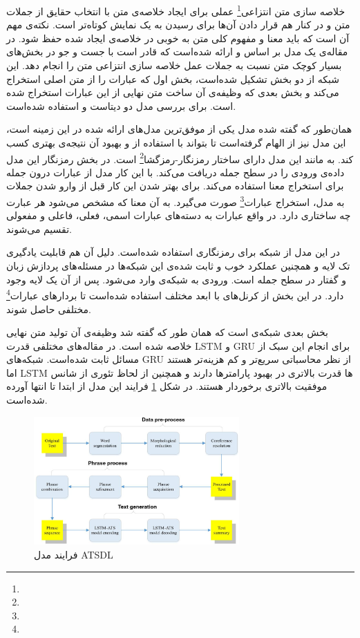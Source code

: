 \documentclass[12pt, a4paper, oneside]{report}
\begin{document}
خلاصه سازی متن انتزاعی\footnote{}
عملی برای ایجاد خلاصه‌ی متن با انتخاب حقایق از جملات متن و در کنار هم قرار دادن آن‌ها برای رسیدن به یک
نمایش کوتاه‌تر است. نکته‌ی مهم آن است که باید معنا و مفهوم کلی متن به خوبی در خلاصه‌ی ایجاد شده حفظ شود.
در مقاله‌ی
\cite{song2019abstractive}
یک مدل بر اساس
و
ارائه شده‌است که قادر است با جست و جو در بخش‌های بسیار کوچک متن نسبت به جملات عمل خلاصه سازی انتزاعی
متن را انجام دهد.
این شبکه از دو بخش تشکیل شده‌است، بخش اول که عبارات را از متن اصلی استخراج می‌کند
و بخش بعدی که وظیفه‌ی آن ساخت متن نهایی از این عبارات استخراج شده است.
برای بررسی مدل دو دیتاست
و
استفاده شده‌است. 

همان‌طور که گفته شده مدل
یکی از موفق‌ترین مدل‌های ارائه شده در این زمینه است، این مدل نیز از
الهام گرفته‌است تا بتواند با استفاده از و بهبود آن نتیجه‌ی بهتری کسب کند.
به مانند
این مدل دارای ساختار
رمزنگار-رمزگشا\footnote{}
است. در بخش رمزنگار این مدل داده‌ی ورودی را در سطح جمله دریافت می‌کند. با این کار مدل از
عبارات درون جمله برای استخراج معنا استفاده می‌کند. برای بهتر شدن این کار قبل از وارو شدن جملات به
مدل، استخراج عبارات\footnote{}
صورت می‌گیرد. به آن معنا که مشخص می‌شود هر عبارت چه ساختاری دارد. در واقع عبارات به
دسته‌های عبارات اسمی، فعلی، فاعلی و مفعولی تقسیم می‌شوند. 

در این مدل از شبکه
برای رمزنگاری استفاده شده‌است. دلیل آن هم قابلیت یادگیری تک لایه و همچنین عملکرد خوب و ثابت شده‌ی
این شبکه‌ها در مسئله‌های پردازش زبان و گفتار در سطح جمله است. ورودی به شبکه‌ی
وارد می‌شود. پس از آن یک لایه
وجود دارد. در این بخش از کرنل‌های با ابعد مختلف استفاده شده‌است تا
بردار‌های عبارات\footnote{}
مختلفی حاصل شوند.

بخش بعدی شبکه‌ی
است که همان طور که گفته شد وظیفه‌ی آن تولید متن نهایی خلاصه شده است.
در مقاله‌های مختلفی قدرت
LSTM
و
GRU
برای انجام این سبک از مسائل ثابت شده‌است. شبکه‌های
GRU
از نظر محاسباتی سریع‌تر و کم هزینه‌تر هستند اما 
LSTM
ها قدرت بالاتری در بهبود پارامترها دارند و همچنین از لحاظ تئوری از شانس موفقیت بالاتری برخوردار هستند.
در شکل
\ref{fig:ATSDL}
فرایند این مدل از ابتدا تا انتها آورده شده‌است.

\begin{figure}[!ht]
    \centering
    \includegraphics[width=0.7\textwidth]{ATSDL}
    \caption{فرایند مدل ATSDL}
    \label{fig:ATSDL}
\end{figure}
\end{document}
